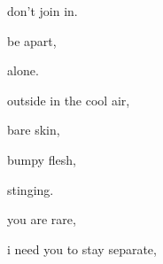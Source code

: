 \documentclass[extrafontsizes, 48pt]{memoir}
\newcommand\blankpage{%
    \null
    \thispagestyle{empty}%
    \addtocounter{page}{-1}%
    \newpage}
\begin{document}
	\begin{minipage}{.6\textwidth}
	don't join in.
	\end{minipage}
	\newpage

	\begin{minipage}{.6\textwidth}
	be apart, 
	\end{minipage}
	\newpage

	\begin{minipage}{.6\textwidth}
	alone.
	\afterpage{\blankpage}
	\end{minipage}
	\newpage

	\begin{minipage}{.6\textwidth}
	outside in the cool air,
	\end{minipage}
	\newpage

	\begin{minipage}{.6\textwidth}
	bare skin,
	\end{minipage}
	\newpage

	\begin{minipage}{.6\textwidth}
	bumpy flesh,
	\end{minipage}
	\newpage

	\begin{minipage}{.6\textwidth}
	stinging.
	\afterpage{\blankpage}
	\end{minipage}
	\newpage

	\begin{minipage}{.6\textwidth}
	you are rare,
	\end{minipage}
	\newpage

	\begin{minipage}{.6\textwidth}
	i need you to stay separate,
	\end{minipage}
	\newpage
\end{document}
